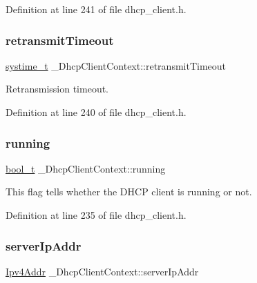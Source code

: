 Definition at line 241 of file dhcp\+\_\+client.\+h.

\mbox{\label{struct__DhcpClientContext_a4715d2ef9846320ea545dfc8fcab57de}} 
\subsubsection{\texorpdfstring{retransmit\+Timeout}{retransmitTimeout}}
{\footnotesize\ttfamily \hyperlink{compiler__port_8h_ae3e32a98d431a02106616da3071832dd}{systime\+\_\+t} \+\_\+\+Dhcp\+Client\+Context\+::retransmit\+Timeout}



Retransmission timeout. 



Definition at line 240 of file dhcp\+\_\+client.\+h.

\mbox{\label{struct__DhcpClientContext_a6d107c4fdd65d880aea27e5a02ece48e}} 
\subsubsection{\texorpdfstring{running}{running}}
{\footnotesize\ttfamily \hyperlink{compiler__port_8h_a812d16e5494522586b3784e55d479912}{bool\+\_\+t} \+\_\+\+Dhcp\+Client\+Context\+::running}



This flag tells whether the D\+H\+CP client is running or not. 



Definition at line 235 of file dhcp\+\_\+client.\+h.

\mbox{\label{struct__DhcpClientContext_a09359e88296df298b57657c63acab7ac}} 
\subsubsection{\texorpdfstring{server\+Ip\+Addr}{serverIpAddr}}
{\footnotesize\ttfamily \hyperlink{ipv4_8h_a411debb3d770caa0c06d3f73367da37f}{Ipv4\+Addr} \+\_\+\+Dhcp\+Client\+Context\+::server\+Ip\+Addr}



